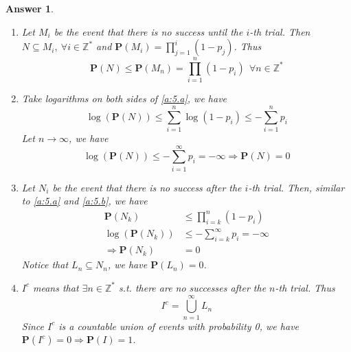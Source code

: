 \documentclass[utf8]{article}
\theoremstyle{definition}%
\theoremstyle{plain}%
\newtheorem{answer}{Answer} %
\begin{document}
\begin{answer} ~
    \begin{enumerate}[label=(\alph*)]
        \item \label{a:5.a} Let $M_i$ be the event that there is no success until the $i$-th trial. Then $N \subseteq M_i,~\forall i \in \mathbb{Z^*}$ and $\mathbf{P}(M_i) = \prod_{j=1}^i (1-p_j)$. Thus
        \begin{equation}
            \mathbf{P}(N) \leq \mathbf{P}(M_n) = \prod_{i=1}^n (1-p_i) ~~ \forall n \in \mathbb{Z^*}
        \end{equation}
        \item \label{a:5.b} Take logarithms on both sides of \ref{a:5.a}, we have
        \begin{equation}
            \log(\mathbf{P}(N)) \leq \sum_{i=1}^n \log(1-p_i) \leq -\sum_{i=1}^n p_i
        \end{equation}
        Let $ n \to \infty $, we have 
        \begin{equation}
            \log(\mathbf{P}(N)) \leq -\sum_{i=1}^\infty p_i = -\infty \Rightarrow \mathbf{P}(N) = 0
        \end{equation}
        \item Let $N_i$ be the event that there is no success after the $i$-th trial. Then, similar to \ref{a:5.a} and \ref{a:5.b}, we have
        \begin{equation}
        \begin{aligned}
            \mathbf{P}(N_k) &\leq \prod_{i=k}^n (1-p_i) \\
            \log(\mathbf{P}(N_k)) &\leq -\sum_{i=k}^\infty p_i = -\infty \\ 
            \Rightarrow \mathbf{P}(N_k) &= 0
        \end{aligned}
        \end{equation}
        Notice that $L_n \subseteq N_n$, we have $\mathbf{P}(L_n) = 0$.
        \item $I^c$ means that $\exists n \in \mathbb{Z^*}$ s.t. there are no successes after the $n$-th trial. Thus
        \begin{equation}
            I^c = \bigcup_{n=1}^\infty L_n
        \end{equation}
        Since $I^c$ is a countable union of events with probability 0, we have $\mathbf{P}(I^c) = 0 \Rightarrow \mathbf{P}(I) = 1$.
    \end{enumerate}
\end{answer}
\end{document}
